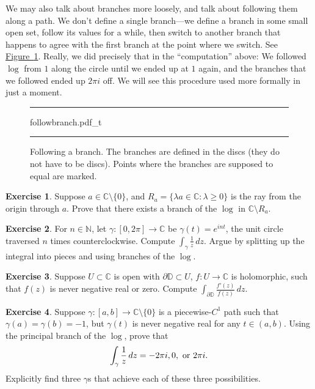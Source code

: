 \documentclass[12pt,openany]{book}
\newcommand{\avoidbreak}{\postdisplaypenalty=100}
\newcommand{\C}{{\mathbb{C}}}
\newcommand{\N}{{\mathbb{N}}}
\newcommand{\D}{{\mathbb{D}}}
\newcommand{\myquote}[1]{``#1''}
\theoremstyle{plain}
\theoremstyle{remark}
\theoremstyle{definition}
\newenvironment{exbox}{%
    \def\FrameCommand{\vrule width 1pt \relax\hspace{10pt}}%
    \MakeFramed{\advance\hsize-\width\FrameRestore}%
}{%
    \endMakeFramed
}
\newenvironment{myfig}{%
\begin{figure}[h!t]
\noindent\rule{\textwidth}{0.5pt}\vspace{12pt}\par\centering}%
{\par\noindent\rule{\textwidth}{0.5pt}
\end{figure}}
\theoremstyle{exercise}
\newtheorem{exercise}{Exercise}[section]
\theoremstyle{example}
\newcommand{\figureref}[1]{\hyperref[#1]{Figure~\ref*{#1}}}
\begin{document}
We may also talk about branches more loosely, and talk
about following them along a path.  We don't define
a single branch---we define a branch in some small open set,
follow its values for a while, then switch to another branch that 
happens to agree with the first branch at the point where we
switch.  See \figureref{fig:followbranch}.  Really, we did precisely that in the
\myquote{computation} above:  We followed $\log$ from $1$ along the circle until we
ended up at $1$ again, and the branches that we followed ended up $2\pi i$
off.  We will see this procedure used more formally in just a moment.

\begin{myfig}
{followbranch.pdf_t}
\caption{Following a branch.
The branches are defined in the discs
(they do not have to be discs).
Points where the branches are supposed to equal
are marked.\label{fig:followbranch}}
\end{myfig}

\begin{exbox}
\begin{exercise}
Suppose $a \in \C \setminus \{ 0 \}$, and
$R_a = \{ \lambda a \in \C : \lambda \geq 0 \}$
is the ray from the origin through $a$.  Prove
that there exists a branch of the $\log$ in $\C \setminus R_a$.
\end{exercise}

\begin{exercise}
For $n \in \N$, let $\gamma \colon [0,2\pi] \to \C$ be $\gamma(t) = e^{int}$,
the unit circle traversed $n$ times counterclockwise.  Compute
$\int_\gamma \frac{1}{z} \, dz$.  Argue by splitting up the integral
into pieces and using branches of the $\log$.
\end{exercise}

\begin{exercise}
Suppose
$U \subset \C$ is open with
$\partial \D \subset U$,
$f \colon U \to \C$ is holomorphic,
such that
$f(z)$ is never negative real or zero.
Compute
$\int_{\partial \D} \frac{f'(z)}{f(z)} \, dz$.
\end{exercise}

\begin{exercise}
Suppose $\gamma \colon [a,b] \to \C \setminus \{ 0 \}$ is a piecewise-$C^1$
path such that $\gamma(a) = \gamma(b) = -1$, but $\gamma(t)$ is never
negative real for any $t \in (a,b)$.  Using the principal branch of the
$\log$, prove that
\begin{equation*}
\int_\gamma \frac{1}{z} \, dz = -2\pi i, 0, \text{ or } 2\pi i.
\avoidbreak
\end{equation*}
Explicitly
find three $\gamma$s that achieve each of these three possibilities.
\end{exercise}
\end{exbox}
\end{document}
